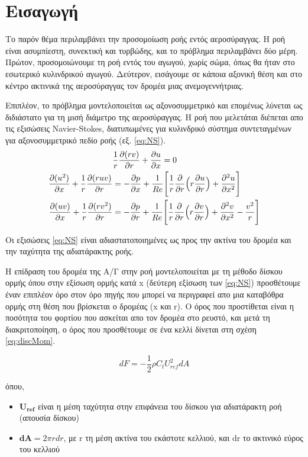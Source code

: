 \section*{Εισαγωγή}

Το παρόν θέμα περιλαμβάνει την προσομοίωση ροής εντός αεροσύραγγας. Η ροή είναι ασυμπίεστη, συνεκτική και τυρβώδης, και το πρόβλημα περιλαμβάνει δύο μέρη. Πρώτον, προσομοιώνουμε τη ροή εντός του αγωγού, χωρίς σώμα, όπως θα ήταν στο εσωτερικό κυλινδρικού αγωγού. Δεύτερον, εισάγουμε σε κάποια αξονική θέση και στο κέντρο ακτινικά της αεροσύραγγας τον δρομέα μιας ανεμογεννήτριας. 

Επιπλέον, το πρόβλημα μοντελοποιείται ως αξονοσυμμετρικό και επομένως λύνεται ως διδιάστατο για τη μισή διάμετρο της αεροσύραγγας.
Η ροή που μελετάται διέπεται απο τις εξισώσεις Navier-Stokes, διατυπωμένες για κυλινδρικό σύστημα συντεταγμένων για αξονοσυμμετρικό πεδίο ροής (εξ. \ref{eq:NS}).
\begin{equation}
    \begin{aligned}
        &\dfrac{1}{r}\dfrac{\partial(rv)}{\partial r} + \dfrac{\partial u}{\partial x} = 0\\ 
        \dfrac{\partial (u^2)}{\partial x}+\dfrac{1}{r}\dfrac{\partial (ruv)}{\partial r} &= -\dfrac{\partial p}{\partial x} + \dfrac{1}{Re}\Bigg[\dfrac{1}{r}\dfrac{\partial }{\partial r}\Big(r\dfrac{\partial u}{\partial r}\Big) + \dfrac{\partial ^2u}{\partial x^2}\Bigg]\\
        \dfrac{\partial (uv)}{\partial x}+\dfrac{1}{r}\dfrac{\partial (rv^2)}{\partial r}&=-\dfrac{\partial p}{\partial r}+\dfrac{1}{Re}\Bigg[\dfrac{1}{r}\dfrac{\partial }{\partial r}\Big(r\dfrac{\partial v}{\partial r}\Big)+\dfrac{\partial ^2v}{\partial x^2}-\dfrac{v^2}{r}\Bigg] 
    \end{aligned}
    \label{eq:NS}
\end{equation}

Οι εξισώσεις \ref{eq:NS} είναι αδιαστατοποιημένες ως προς την ακτίνα του δρομέα και την ταχύτητα της αδιατάρακτης ροής.

Η επίδραση του δρομέα της Α/Γ στην ροή μοντελοποιείται με τη μέθοδο δίσκου ορμής όπου στην εξίσωση ορμής κατά x (δεύτερη εξίσωση των \ref{eq:NS}) προσθέτουμε έναν επιπλέον όρο στον όρο πηγής που μπορεί να περιγραφεί απο μια καταβόθρα ορμής στη θέση που βρίσκεται ο δρομέας (x και r). Ο όρος που προστίθεται είναι η ποσότητα του φορτίου που ασκείται απο τον δρομέα στο ρευστό, και μετά τη διακριτοποίηση, ο όρος που προσθέτουμε σε ένα κελλί δίνεται στη σχέση \ref{eq:discMom}.

\begin{equation}
    dF = -\dfrac{1}{2}\rho C_tU^2_{ref}dA 
    \label{eq:discMom}
\end{equation}

όπου,
\begin{itemize}
    \item $\mathbf{U_{ref}}$ είναι η μέση ταχύτητα στην επιφάνεια του δίσκου για αδιατάρακτη ροή (απουσία δίσκου)
    \item $\mathbf{dA} = 2\pi rdr$, με r τη μέση ακτίνα του εκάστοτε κελλιού, και dr το ακτινικό εύρος του κελλιού
\end{itemize}
